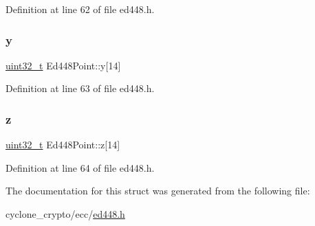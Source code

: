 Definition at line 62 of file ed448.\+h.

\mbox{\label{structEd448Point_a21298d9fefc8531fa8b77062e9e97591}} 
\subsubsection{\texorpdfstring{y}{y}}
{\footnotesize\ttfamily \hyperlink{stdint_8h_a435d1572bf3f880d55459d9805097f62}{uint32\+\_\+t} Ed448\+Point\+::y\mbox{[}14\mbox{]}}



Definition at line 63 of file ed448.\+h.

\mbox{\label{structEd448Point_a17b31287fc682b3d42e6dc5685aaf237}} 
\subsubsection{\texorpdfstring{z}{z}}
{\footnotesize\ttfamily \hyperlink{stdint_8h_a435d1572bf3f880d55459d9805097f62}{uint32\+\_\+t} Ed448\+Point\+::z\mbox{[}14\mbox{]}}



Definition at line 64 of file ed448.\+h.



The documentation for this struct was generated from the following file\+:\begin{DoxyCompactItemize}
\item 
cyclone\+\_\+crypto/ecc/\hyperlink{ed448_8h}{ed448.\+h}\end{DoxyCompactItemize}
